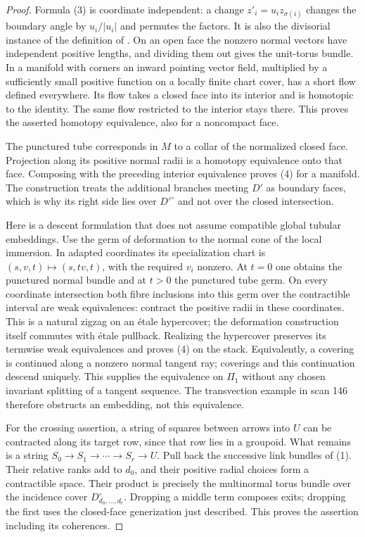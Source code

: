 \begin{proof}
Formula (3) is coordinate independent: a change $z'_i=u_i z_{\sigma(i)}$
changes the boundary angle by $u_i/|u_i|$ and permutes the factors.  It is
also the divisorial instance of the definition of
\citet[\S1.2]{KatoNakayama1999}.  On an open face the nonzero normal
vectors have independent positive lengths, and dividing them out gives
the unit-torus bundle.  In a manifold with corners an inward pointing
vector field, multiplied by a sufficiently small positive function on a
locally finite chart cover, has a short flow defined everywhere.  Its
flow takes a closed face into its interior and is homotopic to the
identity.  The same flow restricted to the interior stays there.  This
proves the asserted homotopy equivalence, also for a noncompact face.

The punctured tube corresponds in $M$ to a collar of the normalized closed
face.  Projection along its positive normal radii is a homotopy
equivalence onto that face.  Composing with the preceding interior
equivalence proves (4) for a manifold.  The construction treats the
additional branches meeting $D'$ as boundary faces, which is why its
right side lies over $D'^\circ$ and not over the closed intersection.

Here is a descent formulation that does not assume compatible global
tubular embeddings.  Use the germ of deformation to the normal cone of
the local immersion.  In adapted coordinates its specialization chart
is $(s,v,t)\mapsto(s,tv,t)$, with the required $v_i$ nonzero.  At $t=0$
one obtains the punctured normal bundle and at $t>0$ the punctured tube
germ.  On every coordinate intersection both fibre inclusions into this
germ over the contractible interval are weak equivalences: contract the
positive radii in these coordinates.  This is a natural zigzag on an
étale hypercover; the deformation construction itself commutes with
étale pullback.  Realizing the hypercover preserves its termwise weak
equivalences and proves (4) on the stack.  Equivalently, a covering is
continued along a nonzero normal tangent ray; coverings and this
continuation descend uniquely.  This supplies the equivalence on
$\Pi_1$ without any chosen invariant splitting of a tangent sequence.
The transvection example in scan 146 therefore obstructs an embedding,
not this equivalence.

For the crossing assertion, a string of squares between arrows into
$U$ can be contracted along its target row, since that row lies in a
groupoid.  What remains is a string
$S_0\to S_1\to\cdots\to S_r\to U$.  Pull back the successive link
bundles of (1).  Their relative ranks add to $d_0$, and their positive
radial choices form a contractible space.  Their product is precisely
the multinormal torus bundle over the incidence cover
$D_{d_0,\ldots,d_r}^\circ$.  Dropping a middle term composes exits;
dropping the first uses the closed-face generization just described.
This proves the assertion including its coherences.


\end{proof}

